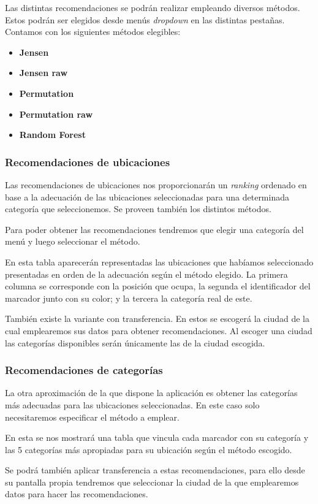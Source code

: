 Las distintas recomendaciones se podrán realizar empleando diversos métodos. Estos podrán ser elegidos desde menús \textit{dropdown} en las distintas pestañas. Contamos con los siguientes métodos elegibles:

\begin{itemize}
	\item \textbf{Jensen}
	\item \textbf{Jensen raw}
	\item \textbf{Permutation}
	\item \textbf{Permutation raw}
	\item \textbf{Random Forest}
\end{itemize}



\subsubsection{Recomendaciones de ubicaciones}

Las recomendaciones de ubicaciones nos proporcionarán un \textit{ranking} ordenado en base a la adecuación de las ubicaciones seleccionadas para una determinada categoría que seleccionemos. Se proveen también los distintos métodos.

Para poder obtener las recomendaciones tendremos que elegir una categoría del menú y luego seleccionar el método.


En esta tabla aparecerán representadas las ubicaciones que habíamos seleccionado presentadas en orden de la adecuación según el método elegido. La primera columna se corresponde con la posición que ocupa, la segunda el identificador del marcador junto con su color; y la tercera la categoría real de este.

También existe la variante con transferencia. En estos se escogerá la ciudad de la cual emplearemos sus datos para obtener recomendaciones. Al escoger una ciudad las categorías disponibles serán únicamente las de la ciudad escogida.

\subsubsection{Recomendaciones de categorías}

La otra aproximación de la que dispone la aplicación es obtener las categorías más adecuadas para las ubicaciones seleccionadas. En este caso solo necesitaremos especificar el método a emplear.


En esta se nos mostrará una tabla que vincula cada marcador con su categoría y las 5 categorías más apropiadas para su ubicación según el método escogido.

Se podrá también aplicar transferencia a estas recomendaciones, para ello desde su pantalla propia tendremos que seleccionar la ciudad de la que emplearemos datos para hacer las recomendaciones.